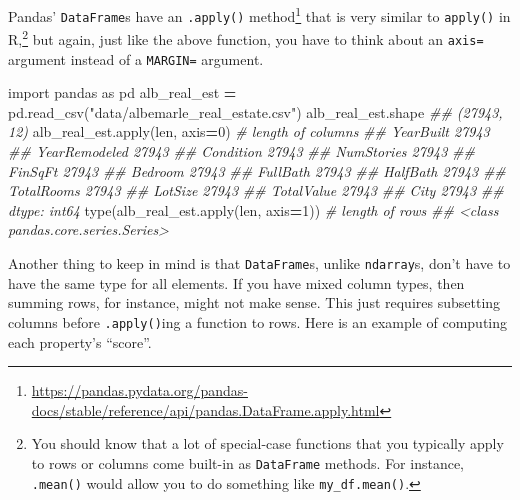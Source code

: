 \documentclass[
  12pt,
]{krantz}
\makeatletter
\newenvironment{Shaded}{\begin{snugshade}}{\end{snugshade}}
\newcommand{\BuiltInTok}[1]{#1}
\newcommand{\CommentTok}[1]{\textcolor[rgb]{0.37,0.37,0.37}{\textit{#1}}}
\newcommand{\DecValTok}[1]{\textcolor[rgb]{0.06,0.06,0.06}{#1}}
\newcommand{\ImportTok}[1]{#1}
\newcommand{\NormalTok}[1]{#1}
\newcommand{\OperatorTok}[1]{\textcolor[rgb]{0.43,0.43,0.43}{\textbf{#1}}}
\newcommand{\StringTok}[1]{\textcolor[rgb]{0.5,0.5,0.5}{#1}}
\renewcommand{\href}[2]{#2\footnote{\url{#1}}}
\newenvironment{kframe}{%
\medskip{}
\setlength{\fboxsep}{.8em}
 \def\at@end@of@kframe{}%
 \ifinner\ifhmode%
  \def\at@end@of@kframe{\end{minipage}}%
  \begin{minipage}{\columnwidth}%
 \fi\fi%
 \def\FrameCommand##1{\hskip\@totalleftmargin \hskip-\fboxsep
 \colorbox{shadecolor}{##1}\hskip-\fboxsep
     \hskip-\linewidth \hskip-\@totalleftmargin \hskip\columnwidth}%
 \MakeFramed {\advance\hsize-\width
   \@totalleftmargin\z@ \linewidth\hsize
   \@setminipage}}%
 {\par\unskip\endMakeFramed%
 \at@end@of@kframe}
\renewenvironment{Shaded}{\begin{kframe}}{\end{kframe}}
\makeatother
\begin{document}
Pandas' \texttt{DataFrame}s have an \href{https://pandas.pydata.org/pandas-docs/stable/reference/api/pandas.DataFrame.apply.html}{\texttt{.apply()} method} that is very similar to \texttt{apply()} in R,\footnote{You should know that a lot of special-case functions that you typically apply to rows or columns come built-in as \texttt{DataFrame} methods. For instance, \texttt{.mean()} would allow you to do something like \texttt{my\_df.mean()}.} but again, just like the above function, you have to think about an \texttt{axis=} argument instead of a \texttt{MARGIN=} argument.

\begin{Shaded}
\begin{Highlighting}[]
\ImportTok{import}\NormalTok{ pandas }\ImportTok{as}\NormalTok{ pd}
\NormalTok{alb\_real\_est }\OperatorTok{=}\NormalTok{ pd.read\_csv(}\StringTok{"data/albemarle\_real\_estate.csv"}\NormalTok{)}
\NormalTok{alb\_real\_est.shape}
\CommentTok{\#\# (27943, 12)}
\NormalTok{alb\_real\_est.}\BuiltInTok{apply}\NormalTok{(}\BuiltInTok{len}\NormalTok{, axis}\OperatorTok{=}\DecValTok{0}\NormalTok{) }\CommentTok{\# length of columns}
\CommentTok{\#\# YearBuilt        27943}
\CommentTok{\#\# YearRemodeled    27943}
\CommentTok{\#\# Condition        27943}
\CommentTok{\#\# NumStories       27943}
\CommentTok{\#\# FinSqFt          27943}
\CommentTok{\#\# Bedroom          27943}
\CommentTok{\#\# FullBath         27943}
\CommentTok{\#\# HalfBath         27943}
\CommentTok{\#\# TotalRooms       27943}
\CommentTok{\#\# LotSize          27943}
\CommentTok{\#\# TotalValue       27943}
\CommentTok{\#\# City             27943}
\CommentTok{\#\# dtype: int64}
\BuiltInTok{type}\NormalTok{(alb\_real\_est.}\BuiltInTok{apply}\NormalTok{(}\BuiltInTok{len}\NormalTok{, axis}\OperatorTok{=}\DecValTok{1}\NormalTok{)) }\CommentTok{\# length of rows}
\CommentTok{\#\# \textless{}class \textquotesingle{}pandas.core.series.Series\textquotesingle{}\textgreater{}}
\end{Highlighting}
\end{Shaded}

Another thing to keep in mind is that \texttt{DataFrame}s, unlike \texttt{ndarray}s, don't have to have the same type for all elements. If you have mixed column types, then summing rows, for instance, might not make sense. This just requires subsetting columns before \texttt{.apply()}ing a function to rows. Here is an example of computing each property's ``score''.
\end{document}
